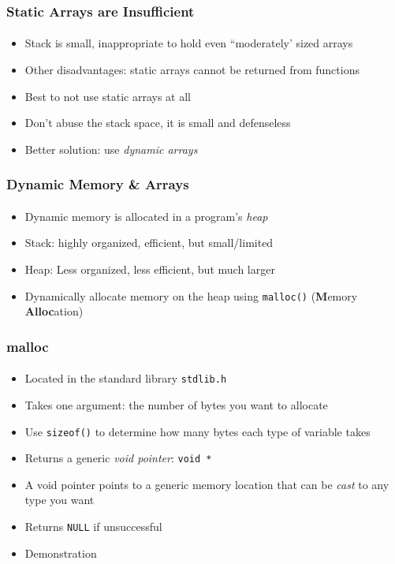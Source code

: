 \documentclass[]{beamer}
\begin{document}
\begin{frame}[fragile]
    \frametitle{Static Arrays are Insufficient}
    \framesubtitle{}

\begin{itemize}[<+->]  
  \item Stack is small, inappropriate to hold even ``moderately' sized arrays
  \item Other disadvantages: static arrays cannot be returned from functions
  \item Best to not use static arrays at all
  \item Don't abuse the stack space, it is small and defenseless 
  \item Better solution: use \emph{dynamic arrays}
\end{itemize}

\end{frame}

\begin{frame}[fragile]
    \frametitle{Dynamic Memory \& Arrays}
    \framesubtitle{}

\begin{itemize}[<+->]  
  \item Dynamic memory is allocated in a program's \emph{heap}
  \item Stack: highly organized, efficient, but small/limited
  \item Heap: Less organized, less efficient, but much larger
  \item Dynamically allocate memory on the heap using 
  \texttt{malloc()} (\textbf{M}emory \textbf{Alloc}ation)
\end{itemize}
\end{frame}

\begin{frame}[fragile]
    \frametitle{malloc}
    \framesubtitle{}

\begin{itemize}[<+->]  
  \item Located in the standard library \texttt{stdlib.h}
  \item Takes one argument: the number of bytes you want to allocate
  \item Use \texttt{sizeof()} to determine how many bytes each type of variable takes
  \item Returns a generic \emph{void pointer}: \texttt{void *}
  \item A void pointer points to a generic memory location that can be 
  \emph{cast} to any type you want
  \item Returns \texttt{NULL} if unsuccessful
  \item Demonstration
\end{itemize}

\end{frame}
\end{document}
